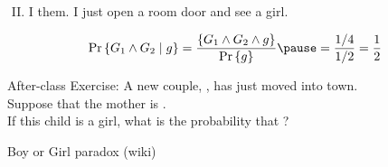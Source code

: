 \begin{frame}{}
  \centerline{}

  \vspace{0.60cm}
  \begin{enumerate}[(I)]
    \setcounter{enumi}{1}
    \item {} I  them. I just open a room door and see a girl.
  \end{enumerate}

  \pause
  \vspace{0.50cm}
  \[
    \Pr\set{G_1 \land G_2 \mid g} = \frac{\set{G_1 \land G_2 \land g}}{\Pr\set{g}} \pause = \frac{1/4}{1/2} = \frac{1}{2}
  \]
\end{frame}

\begin{frame}{}
  \begin{exampleblock}{After-class Exercise:}
    A new couple, , has just moved into town. \\
    Suppose that the mother is . \\
    If this child is a girl, what is the probability that ?
  \end{exampleblock}

  \vspace{0.50cm}
\end{frame}

\begin{frame}{}

  \vspace{-0.30cm}
  \centerline{Boy or Girl paradox (wiki)}
\end{frame}
